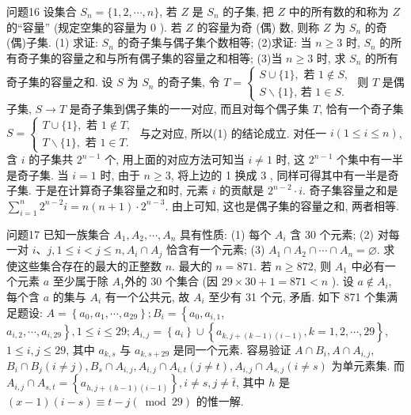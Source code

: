 问题16 设集合 $S_n=\{1,2, \cdots, n\}$, 若 $Z$ 是 $S_n$ 的子集, 把 $Z$ 中的所有数的和称为 $Z$ 的“容量” (规定空集的容量为 0 ). 若 $Z$ 的容量为奇 (偶) 数, 则称 $Z$ 为 $S_n$ 的奇 (偶)子集.
(1) 求证: $S_n$ 的奇子集与偶子集个数相等;
(2)求证: 当 $n \geqslant 3$ 时, $S_n$ 的所有奇子集的容量之和与所有偶子集的容量之和相等;
(3)当 $n \geqslant 3$ 时, 求 $S_n$ 的所有奇子集的容量之和.
设 $S$ 为 $S_n$ 的奇子集, 令 $T=\left\{\begin{array}{l}S \cup\{1\}, \text { 若 } 1 \notin S, \\ S \backslash\{1\} \text {, 若 } 1 \in S .\end{array}\right.$ 则 $T$ 是偶子集, $S \rightarrow T$ 是奇子集到偶子集的一一对应, 而且对每个偶子集 $T$, 恰有一个奇子集 $S=\left\{\begin{array}{l}T \cup\{1\}, \text { 若 } 1 \notin T, \\ T \backslash\{1\}, \text { 若 } 1 \in T .\end{array}\right.$ 与之对应, 所以(1) 的结论成立.
对任一 $i(1 \leqslant i \leqslant n)$, 含 $i$ 的子集共 $2^{n-1}$ 个, 用上面的对应方法可知当 $i \neq 1$ 时, 这 $2^{n-1}$ 个集中有一半是奇子集.
当 $i=1$ 时, 由于 $n \geqslant 3$, 将上边的 1 换成 3 , 同样可得其中有一半是奇子集.
于是在计算奇子集容量之和时, 元素 $i$ 的贡献是 $2^{n-2} \cdot i$. 奇子集容量之和是 $\sum_{i=1}^n 2^{n-2} i=n(n+1) \cdot 2^{n-3}$. 由上可知, 这也是偶子集的容量之和, 两者相等.



问题17 已知一族集合 $A_1, A_2, \cdots, A_n$ 具有性质:
(1) 每个 $A_i$ 含 30 个元素;
(2) 对每一对 $i 、 j, 1 \leqslant i<j \leqslant n, A_i \cap A_j$ 恰含有一个元素;
(3) $A_1 \cap A_2 \cap \cdots \cap A_n=\varnothing$.
求使这些集合存在的最大的正整数 $n$.
最大的 $n=871$. 若 $n \geqslant 872$, 则 $A_1$ 中必有一个元素 $a$ 至少属于除 $A_1$外的 30 个集合 (因 $29 \times 30+1=871<n$ ). 设 $a \notin A_i$, 每个含 $a$ 的集与 $A_i$ 有一个公共元, 故 $A_i$ 至少有 31 个元, 矛盾.
如下 871 个集满足题设: $A=\left\{a_0, a_1, \cdots, a_{29}\right\} ; B_i=\left\{a_0, a_{i, 1}\right.$, $\left.a_{i, 2}, \cdots, a_{i, 29}\right\}, 1 \leqslant i \leqslant 29 ; A_{i, j}=\left\{a_i\right\} \cup\left\{a_{k, j+(k-1)(i-1)}, k=1,2, \cdots, 29\right\}$, $1 \leqslant i, j \leqslant 29$, 其中 $a_{k, s}$ 与 $a_{k, s+29}$ 是同一个元素.
容易验证 $A \cap B_i, A \cap A_{i, j}$, $B_i \cap B_j(i \neq j), B_s \cap A_{i, j}, A_{i, j} \cap A_{i, t}(j \neq t), A_{i, j} \cap A_{s, j}(i \neq s)$ 为单元素集.
而 $A_{i, j} \cap A_{s, t}=\left\{a_{h, j+(h-1)(i-1)}\right\}, i \neq s, j \neq \bar{t}$, 其中 $h$ 是 $(x-1)(i-s) \equiv t-j(\bmod 29)$ 的惟一解.




